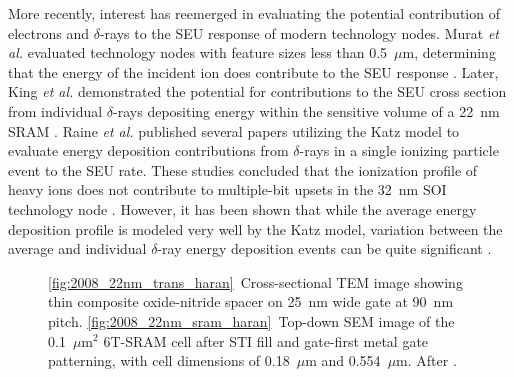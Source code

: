 More recently, interest has reemerged in evaluating the potential contribution of electrons and $\delta$-rays to the SEU response of modern technology nodes.
Murat \emph{et al.} evaluated technology nodes with feature sizes less than 0.5~$\mu$m, determining that the energy of the incident ion does contribute to the SEU response \cite{Murat:kk}.
Later, King \emph{et al.} demonstrated the potential for contributions to the SEU cross section from individual $\delta$-rays depositing energy within the sensitive volume of a 22~nm SRAM \cite{King:2010cu}.
Raine \emph{et al.} published several papers utilizing the Katz model to evaluate energy deposition contributions from $\delta$-rays in a single ionizing particle event to the SEU rate. 
These studies concluded that the ionization profile of heavy ions does not contribute to multiple-bit upsets in the 32~nm SOI technology node \cite{Raine:gk}.
However, it has been shown that while the average energy deposition profile is modeled very well by the Katz model, variation between the average and individual $\delta$-ray energy deposition events can be quite significant \cite{King:2012cb}.

\begin{figure}[htbp]
    \centering
    \caption[\ref{fig:2008_22nm_trans_haran}~Cross-sectional TEM image showing thin composite oxide-nitride spacer on 25~nm wide gate at 90~nm pitch. \ref{fig:2008_22nm_sram_haran}~Top-down SEM image of the 0.1~$\mu$m$^2$ 6T-SRAM cell after STI fill and gate-first metal gate patterning, with cell dimensions of 0.18~$\mu$m and 0.554~$\mu$m.]{\ref{fig:2008_22nm_trans_haran}~Cross-sectional TEM image showing thin composite oxide-nitride spacer on 25~nm wide gate at 90~nm pitch. \ref{fig:2008_22nm_sram_haran}~Top-down SEM image of the 0.1~$\mu$m$^2$ 6T-SRAM cell after STI fill and gate-first metal gate patterning, with cell dimensions of 0.18~$\mu$m and 0.554~$\mu$m. After \cite{Haran:2008ta}.}
    \label{fig:ibm_22nm_trans_sram_spacing}
\end{figure}

